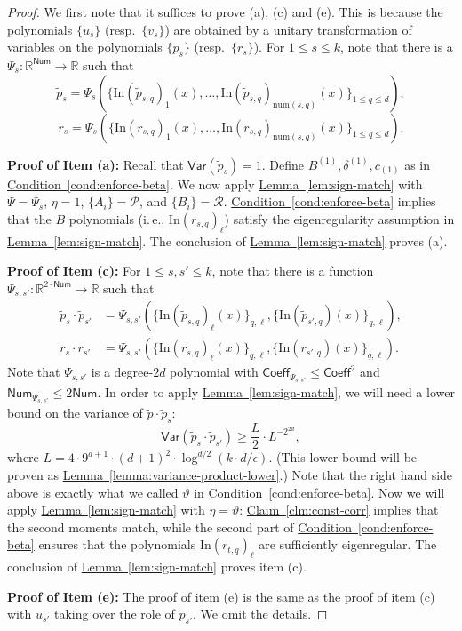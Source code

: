 \documentclass[11pt]{article}
\numberwithin{equation}{section}
\theoremstyle{definition}
\theoremstyle{plain}
\newcommand{\ie}{i.\,e.}
\newcommand{\expref}[2]{\hyperref[#2]{#1~\ref{#2}}}
\newcommand{\Inner}{\mathrm{In}}
\newcommand{\num}{\mathrm{num}}
\begin{document}
\begin{proof}
We first note that it suffices to prove (a), (c) and (e). This is because the polynomials $\{{u}_s\}$ (resp.\ $\{{v}_s\}$) are obtained by a unitary transformation of variables 
on the polynomials $\{\tilde{p}_s\}$ (resp.\ $\{ {r}_s\}$). For $1 \le s \le k$, note that there is a $\Psi_s: \mathbb{R}^{\mathsf{Num}} \rightarrow \mathbb{R}$
%
such that
%
\[
\tilde{p}_s = \Psi_s( \{\Inner(\tilde p_{s,q})_1(x),\dots, \Inner(\tilde p_{s,q})_{\num({s,q})}(x)\}_{ 1 \le q \le d}),
\]
\[
{r}_s = \Psi_s( \{\Inner(r_{s,q})_1(x),\dots, \Inner(r_{s,q})_{\num({s,q})}(x)\}_{ 1 \le q \le d}).
\]

\smallskip
\noindent
\textbf{Proof of Item (a):} Recall that $\mathsf{Var}(\tilde{p}_s)=1$. 
Define $B^{(1)}, \delta^{(1)}, c_{(1)}$ as in
\expref{Condition}{cond:enforce-beta}. We now apply \expref{Lemma}{lem:sign-match} with
$\Psi = \Psi_s$, $\eta=1$, $\{A_i\} = \mathcal{P}$, and $\{B_i\} =
\mathcal{R}$. \expref{Condition}{cond:enforce-beta} implies that the $B$ polynomials
(\ie, $\Inner(r_{s,q})_\ell$) satisfy the eigenregularity assumption
in \expref{Lemma}{lem:sign-match}. The conclusion of \expref{Lemma}{lem:sign-match}
proves (a).

\smallskip
\noindent
\textbf{Proof of Item (c):} For $1 \le s, s' \le k$, note that there is a function $\Psi_{s,s'}: \mathbb{R}^{2 \cdot \mathsf{Num}} \rightarrow \mathbb{R}$ such that 
\begin{align*}
    \tilde{p}_s \cdot \tilde{p}_{s'} &= \Psi_{s,s'}( \{\Inner(\tilde p_{s,q})_\ell(x)\}_{q,\ell}, \{\Inner(\tilde p_{s',q})(x)\}_{q,\ell}), \\
    r_s \cdot r_{s'} &= \Psi_{s,s'}( \{\Inner(r_{s,q})_\ell(x)\}_{q,\ell}, \{\Inner(r_{s',q})(x)\}_{q,\ell}).
\end{align*}
Note that $\Psi_{s,s'}$ is a degree-$2d$ polynomial with
$\mathsf{Coeff}_{\Psi_{s,s'}} \le \mathsf{Coeff}^2$ and
$\mathsf{Num}_{\Psi_{s,s'}} \le 2 \mathsf{Num}$. In order to apply \expref{Lemma}{lem:sign-match}, we will need a lower bound on the variance of $\tilde p \cdot \tilde p_s$:
\[
\mathsf{Var}(\tilde{p}_s \cdot \tilde{p}_{s'}) \ge \frac{L}{2} \cdot L^{-2^{2d}},
\]
where $L = 4 \cdot 9^{d+1} \cdot (d+1)^2 \cdot \log^{d/2} (k \cdot d/\epsilon)$.
(This lower bound will be proven as \expref{Lemma}{lemma:variance-product-lower}.) Note
that the right hand side above is exactly what we called $\vartheta$ in
\expref{Condition}{cond:enforce-beta}.
Now we will apply \expref{Lemma}{lem:sign-match} with $\eta = \vartheta$:
\expref{Claim}{clm:const-corr}
implies that the second moments match, while the second part of
\expref{Condition}{cond:enforce-beta} ensures that the polynomials
$\Inner(r_{t,q})_\ell$ are sufficiently eigenregular.
The conclusion of \expref{Lemma}{lem:sign-match} proves item (c).

\smallskip
\noindent
\textbf{Proof of Item (e):} The proof of item (e) is the same as the proof of item (c) with $u_{s'}$ taking over the role of $\tilde{p}_{s'}$. We omit the details.
\end{proof}
\end{document}
